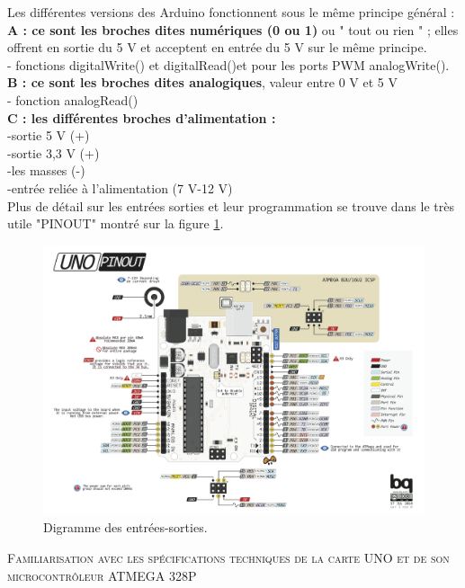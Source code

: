 \documentclass[a4paper, 11pt]{article}           %
\newcommand{\partie}[1]{\textsc{\Large #1} }
\begin{document}
Les différentes versions des Arduino fonctionnent sous le même principe général :\\
\textbf{A : ce sont les broches dites numériques (0 ou 1)} ou " tout ou rien " ; elles offrent en sortie du 5 V et acceptent en entrée du 5 V sur le même principe.\\
- fonctions digitalWrite() et digitalRead()et pour les ports PWM analogWrite().\\
\textbf{B : ce sont les broches dites analogiques}, valeur entre 0 V et 5 V\\
- fonction analogRead()\\
\textbf{C : les différentes broches d'alimentation :}\\
-sortie 5 V (+)\\
-sortie 3,3 V (+)\\
-les masses (-)\\
-entrée reliée à l'alimentation (7 V-12 V)\\

Plus de détail sur les entrées sorties et leur programmation se trouve dans le très utile "PINOUT" montré sur la figure \ref{pinout}.
\begin{figure}[p]
\begin{center}
\includegraphics[angle=90, width=\textwidth]{UNOV3PDF}
\caption{Digramme des entrées-sorties.}
\label{pinout}
\end{center}
\end{figure}


\bigskip

\partie{Familiarisation avec les spécifications techniques de la carte UNO et de son microcontrôleur ATMEGA 328P}\\ %
\end{document}
